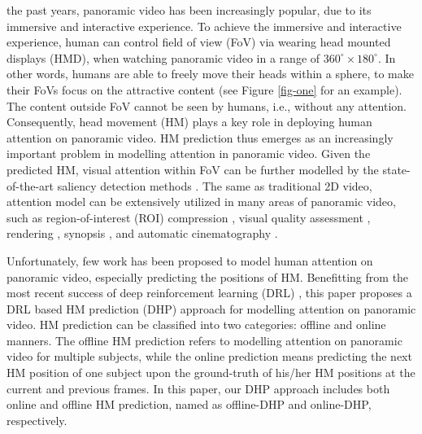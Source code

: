 \documentclass[10pt,journal,compsoc]{IEEEtran}
\begin{document}
%
%
%
%
 the past years, panoramic video \cite{neumann2000immersive} has been increasingly popular, due to its immersive and interactive experience.
To achieve the immersive and interactive experience, human can control field of view (FoV) via wearing head mounted displays (HMD), when watching panoramic video in a range of $360^{\circ} \times 180^{\circ}$.
In other words, humans are able to freely move their heads within a sphere, to make their FoVs focus on the attractive content (see Figure \ref{fig-one} for an example).
The content outside FoV cannot be seen by humans, i.e., without any attention.
Consequently, head movement (HM) plays a key role in deploying human attention on panoramic video.
HM prediction thus emerges as an increasingly important problem in modelling attention in panoramic video.
Given the predicted HM, visual attention within FoV can be further modelled by the state-of-the-art saliency detection methods \cite{borji2013state}.
The same as traditional 2D video, attention model can be extensively utilized in many areas of panoramic video, such as region-of-interest (ROI) compression \cite{de2016video}, visual quality assessment \cite{gaddam2016tiling}, rendering \cite{stengel2016gaze}, synopsis \cite{Pritch08}, and automatic cinematography \cite{su2016pano2vid}.

Unfortunately, few work has been proposed to model human attention on panoramic video, especially predicting the positions of HM.
Benefitting from the most recent success of deep reinforcement learning (DRL) \cite{mnih2016asynchronous}, this paper proposes a DRL based HM prediction (DHP) approach for modelling attention on panoramic video.
HM prediction can be classified into two categories: offline and online manners.
The offline HM prediction refers to modelling attention on panoramic video for multiple subjects, while the online prediction means predicting the next HM position of one subject upon the ground-truth of his/her HM positions at the current and previous frames. In this paper, our DHP approach includes both online and offline HM prediction, named as offline-DHP and online-DHP, respectively.
\end{document}
